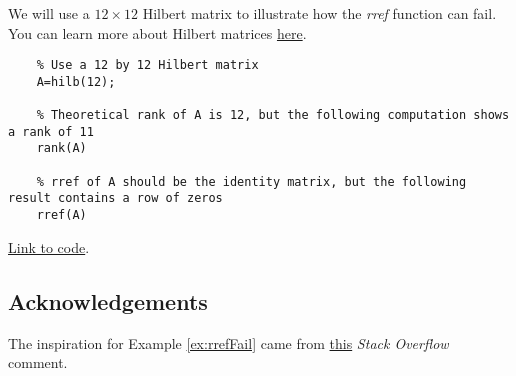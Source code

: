 \documentclass{ximera}
\begin{document}
\begin{example}\label{ex:rrefFail}
    We will use a $12\times 12$ Hilbert matrix to illustrate how the \emph{rref} function can fail.  You can learn more about Hilbert matrices \href{https://en.wikipedia.org/wiki/Hilbert_matrix}{here}.

    \begin{verbatim}
    % Use a 12 by 12 Hilbert matrix
    A=hilb(12);

    % Theoretical rank of A is 12, but the following computation shows a rank of 11
    rank(A)

    % rref of A should be the identity matrix, but the following result contains a row of zeros
    rref(A)
    \end{verbatim}

    \href{https://sagecell.sagemath.org/?z=eJxtjjEOwjAMRfdKuYOXSkViSVfE0I0DwAGS1iUWaYwSR6WcnrSFjcWyrP_fcw23hGBAt2CXdV7IW4wCk5FIL1V1Z1cujW4PJ1WpqoarQ44o1BsP0YQH8AgdUCrlI9gsIA5hZO95pnCHnqdnFiPEAZLjORXZr6a1qta96Q47O0Ycd16JZj-AxQ1HAwYhWb5f_fNETNlL0QUxFDYLzyvrjZFT8RR08XwAMi9N1g==&lang=octave&interacts=eJyLjgUAARUAuQ==}{Link to code}.

\end{example}

\subsection*{Acknowledgements}

The inspiration for Example \ref{ex:rrefFail} came from \href{https://stackoverflow.com/questions/42893111/matlab-rref-function-precision-error-after-12th-column-of-hilbert-matrices}{this} \emph{Stack Overflow} comment.
\end{document}
